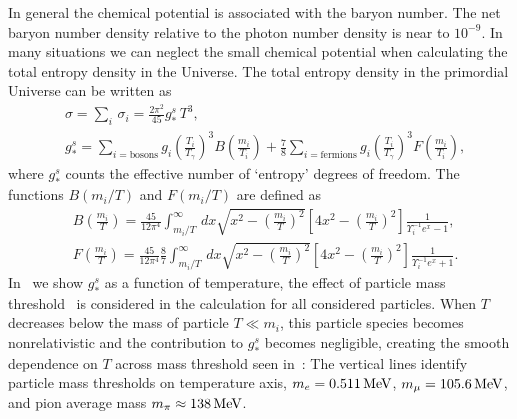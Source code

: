 In general the chemical potential is associated with the baryon number. The net baryon number density relative to the photon number density is near to $10^{-9}$. In many situations we can neglect the small chemical potential when calculating the total entropy density in the Universe. The total entropy density in the primordial Universe can be written as
\begin{align}\label{eq:entg}
&\sigma=\sum_i\,\sigma_i=\frac{2\pi^2}{45}g^s_\ast\,T^3,\\
&g^s_\ast=\sum_{i=\mathrm{bosons}}g_i\left({\frac{T_i}{T_\gamma}}\right)^3B\left(\frac{m_i}{T_i}\right)+\frac{7}{8}\sum_{i=\mathrm{fermions}}g_i\left({\frac{T_i}{T_\gamma}}\right)^3F\left(\frac{m_i}{T_i}\right),
\end{align}
where $g^s_\ast$ counts the effective number of `entropy' degrees of freedom. The functions $B(m_i/T)$ and $F(m_i/T)$ are defined as 
\begin{align}
&B\left(\frac{m_i}{T}\right)=\frac{45}{12\pi^4}\int^\infty_{m_i/T}\,dx\sqrt{x^2-\left(\frac{m_i}{T}\right)^2}\left[4x^2-\left(\frac{m_i}{T}\right)^2\right]\frac{1}{\Upsilon^{-1}_ie^x-1},\\
&F\left(\frac{m_i}{T}\right)=\frac{45}{12\pi^4}\frac{8}{7}\int^\infty_{m_i/T}\,dx\sqrt{x^2-\left(\frac{m_i}{T}\right)^2}\left[4x^2-\left(\frac{m_i}{T}\right)^2\right]\frac{1}{\Upsilon^{-1}_ie^x+1}.
\end{align}
In~ we show $g^s_\ast$ as a function of temperature, the effect of particle mass threshold~\cite{Coc:2006rt} is considered in the calculation for all considered particles. When $T$ decreases below the mass of particle $T\ll m_i$, this particle species becomes nonrelativistic and the contribution to $g^s_\ast$ becomes negligible, creating the smooth dependence on $T$ across mass threshold seen in~: The vertical lines identify particle mass thresholds on temperature axis, $m_e=0.511\text{\,MeV}$, $m_\mu=105.6\text{\,MeV}$, and pion average mass $m_\pi\approx138\text{\,MeV}$.

